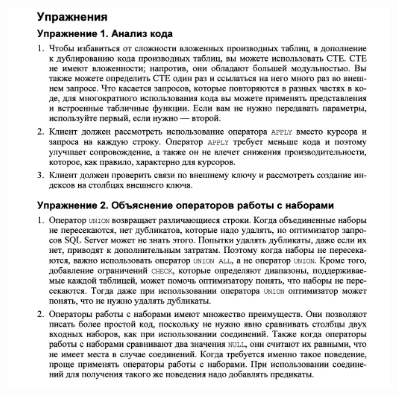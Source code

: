 \begin{figure}[h!]
	\begin{center}
		\includegraphics[width=0.9\textwidth]{img/eans4.png}
	\end{center}
	\captionsetup{justification=centering}
\end{figure}